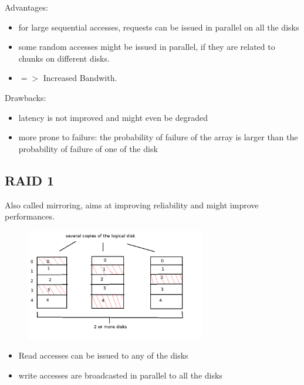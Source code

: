 Advantages:

\begin{itemize}
  \item for large sequential accesses, requests can be issued in parallel on all the disks
  \item some random accesses might be issued in parallel, if they are related to chunks on different disks.
  \item $=>$ Increased Bandwith.
\end{itemize}

Drawbacks:

\begin{itemize}
  \item latency is not improved and might even be degraded
  \item more prone to failure: the probability of failure of the array is larger than the probability of failure of one of the disk
\end{itemize}

\subsection{RAID 1}

Also called mirroring, aims at improving reliability and might improve performances.

\begin{figure}[h!]
  \begin{center}
    \includegraphics[width=0.7\textwidth]{raid_1.png}
  \end{center}
\end{figure}

\begin{itemize}
  \item Read accesses can be issued to any of the disks
  \item write accesses are broadcasted in parallel to all the disks
\end{itemize}

